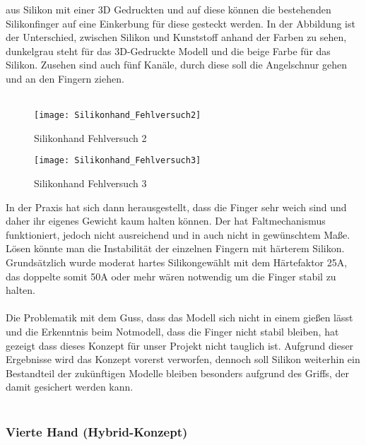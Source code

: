 \documentclass[titlepage,12pt,twoside]{article}
\begin{document}
aus Silikon mit einer 3D Gedruckten und auf diese können die bestehenden Silikonfinger auf eine Einkerbung für diese gesteckt werden. In der Abbildung ist der Unterschied, zwischen Silikon und Kunststoff anhand der Farben zu sehen, dunkelgrau steht 
für das 3D-Gedruckte Modell und die beige Farbe für das Silikon. Zusehen sind auch fünf Kanäle, durch diese soll die Angelschnur gehen und an den Fingern ziehen. \\
\\
\begin{figure}[H]
	\begin{center}
		\scalebox{1.2}
		{\texttt{[image: Silikonhand\_Fehlversuch2]}}
		\caption{Silikonhand Fehlversuch 2}
		\label{fig:Silikonhand_Fehlversuch2}			
	\end{center}
\end{figure}
\begin{figure}[H]
	\begin{center}
		\scalebox{1.2}
		{\texttt{[image: Silikonhand\_Fehlversuch3]}}
		\caption{Silikonhand Fehlversuch 3}
		\label{fig:Silikonhand_Fehlversuch3}			
	\end{center}
\end{figure}
\hfill \break
In der Praxis hat sich dann herausgestellt, dass die Finger sehr weich sind und daher ihr eigenes Gewicht kaum halten können. Der hat Faltmechanismus funktioniert, jedoch nicht ausreichend und in auch nicht in gewünschtem Maße. Lösen könnte man die 
Instabilität der einzelnen Fingern mit härterem Silikon. Grundsätzlich wurde moderat hartes Silikongewählt mit dem Härtefaktor 25A, das doppelte somit 50A oder mehr wären notwendig um die Finger stabil zu halten. \\
\\
Die Problematik mit dem Guss, dass das Modell sich nicht in einem gießen lässt und die Erkenntnis beim Notmodell, dass die Finger nicht stabil bleiben, hat gezeigt dass dieses Konzept für unser Projekt nicht tauglich ist. Aufgrund dieser 
Ergebnisse wird das Konzept vorerst verworfen, dennoch soll Silikon weiterhin ein Bestandteil der zukünftigen Modelle bleiben besonders aufgrund des Griffs, der damit gesichert werden kann. \\
\\

\subsubsection{Vierte Hand (Hybrid-Konzept)}
\end{document}
